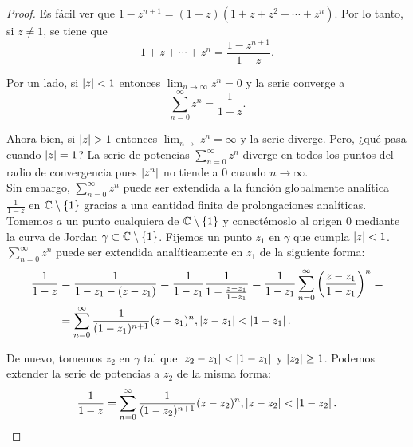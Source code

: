 \begin{proof}
Es fácil ver que $1 - z^{n+1} = (1 - z) (1+ z + z^2 + \cdots + z^n)$. Por lo tanto, si $z \neq 1$, se tiene que
\begin{equation}
    1 + z + \cdots + z^n = \frac{1 - z^{n+1}}{1-z}.
\end{equation}

Por un lado, si $\left\lvert z\right\rvert < 1$ entonces $\lim_{n \to \infty} z^n = 0$ y la serie converge a
\begin{equation*}
    \sum_{n=0}^{\infty} z^n = \frac{1}{1 - z}.
\end{equation*}

Ahora bien, si $\left\lvert z\right\rvert > 1$ entonces $\lim_{n \to} z^n = \infty$ y la serie diverge. Pero, ¿qué pasa cuando $\left\lvert z\right\rvert = 1$? La serie de potencias $\sum_{n=0}^{\infty} z^n$ diverge en todos los puntos del radio de convergencia pues $\left\lvert z^n\right\rvert$ no tiende a 0 cuando $n \to \infty$. \\

Sin embargo, $\sum_{n=0}^{\infty} z^n$ puede ser extendida a la función globalmente analítica $\frac{1}{1-z}$ en $\mathbb{C} \setminus \{1\}$ gracias a una cantidad finita de prolongaciones analíticas. \\

Tomemos $a$ un punto cualquiera de $\mathbb{C} \setminus \{1\}$ y conectémoslo al origen $0$ mediante la curva de Jordan $\gamma \subset \mathbb{C} \setminus \{1\}$. Fijemos un punto $z_1$ en $\gamma$ que cumpla $\left\lvert z\right\rvert < 1$. $\sum_{n=0}^{\infty} z^n$ puede ser extendida analíticamente en $z_1$ de la siguiente forma:
\begin{equation*}
    \begin{split}
        \frac{1}{1-z} & = \frac{1}{1 - z_1 - (z - z_1)} = \frac{1}{1 - z_1} \frac{1}{1 - \frac{z - z_1}{1 - z_1}} = \frac{1}{1 - z_1} \sum_{n=0}^{\infty} \left(\frac{z - z_1}{1 - z_1} \right)^n = \\
                      & = \sum_{n=0}^{\infty}  \frac{1}{(1 - z_1)^{n+1}} (z - z_1)^n, \left\lvert z - z_1\right\rvert < \left\lvert1 - z_1\right\rvert.
    \end{split}
\end{equation*}

De nuevo, tomemos $z_2$ en $\gamma$ tal que $\left\lvert z_2 - z_1\right\rvert < \left\lvert1 - z_1\right\rvert$ y $\left\lvert z_2\right\rvert \geq 1$. Podemos extender la serie de potencias a $z_2$ de la misma forma:
\begin{equation*}
    \frac{1}{1-z} = \sum_{n=0}^{\infty} \frac{1}{(1 - z_2)^{n+1}} (z - z_2)^n , \left\lvert z - z_2\right\rvert < \left\lvert1 - z_2\right\rvert.
\end{equation*}


\end{proof}
